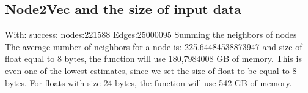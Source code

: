 \subsection{Node2Vec and the size of input data}\label{AP:N2V}

With:
success: nodes:221588 Edges:25000095
Summing the neighbors of nodes
The average number of neighbors for a node is: 225.64484538873947
and size of float equal to 8 bytes, the function will use 180,7984008 GB of memory. This is even one of the lowest estimates, since we set the size of float to be equal to 8 bytes. For floats with size 24 bytes, the function will use 542 GB of memory. 
